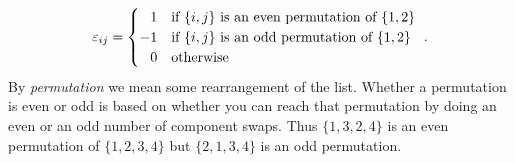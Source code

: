 \documentclass[12pt, oneside]{report}    %
\begin{document}
\begin{align}
    \varepsilon_{ij} = 
    \begin{cases}
    \pp 1 &\text{if }\{i,j\}\text{ is an even permutation of }\{1,2\}\\
    -1 &\text{if }\{i,j\}\text{ is an odd permutation of }\{1,2\}\\
    \pp 0 &\text{otherwise}
    \end{cases}
    \ .
\end{align}
By \emph{permutation} we mean some rearrangement of the list. Whether a permutation is even or odd is based on whether you can reach that permutation by doing an even or an odd number of component swaps. Thus $\{1,3,2,4\}$ is an even permutation of $\{1,2,3,4\}$ but $\{2,1,3,4\}$ is an odd permutation.
\end{document}
